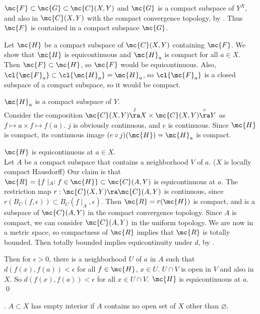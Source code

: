  \(\mc{F} \subset \mc{G} \subset \mc{C}(X, Y)\) and \(\mc{G}\) is a compact subspace of \(Y^X\), and also in \(\mc{C}(X, Y)\) with the compact convergence topology, by . Thus \(\mc{F}\) is contained in a compact subspace \(\mc{G}\).

\note{\mimpd} Let \(\mc{H}\) be a compact subspace of \(\mc{C}(X, Y)\) containing \(\mc{F}\). We show that \(\mc{H}\) is equicontinuous and \(\mc{H}_a\) is compact for all \(a \in X\). Then \(\mc{F} \subset \mc{H}\), so \(\mc{F}\) would be equicontinuous. Also, \(\cl{\mc{F}_a} \subset \cl{\mc{H}_a} = \mc{H}_a\), so \(\cl{\mc{F}_a}\) is a closed subspace of a compact subspace, so it would be compact.

 \(\mc{H}_a\) is a compact subspace of \(Y\).\\
Consider the composition \(\mc{C}(X, Y) \overset{j}{\ra} X \times \mc{C}(X, Y) \overset{e}{\ra} Y\) as \(f \mapsto a \times f \mapsto f(a)\). \(j\) is obviously continuous, and \(e\) is continuous. Since \(\mc{H}\) is compact, its continuous image \((e\circ j)(\mc{H}) = \mc{H}_a\) is compact.

 \(\mc{H}\) is equicontinuous at \(a \in X\).\\
Let \(A\) be a compact subspace that contains a neighborhood \(V\) of \(a\). (\(X\) is locally compact Hausdorff) Our claim is that \(\mc{R} = \{f \mid_A : f \in \mc{H}\} \subset \mc{C}(A, Y)\) is equicontinuous at \(a\). The restriction map \(r : \mc{C}(X, Y) \ra \mc{C}(A, Y)\) is continuous, since \(r(B_C(f, \epsilon)) \subset B_C(f\mid_A, \epsilon)\). Then \(\mc{R} = r(\mc{H})\) is compact, and is a subspace of \(\mc{C}(A, Y)\) in the compact convergence topology. Since \(A\) is compact, we can consider \(\mc{C}(A, Y)\) in the uniform topology. We are now in a metric space, so compactness of \(\mc{R}\) implies that \(\mc{R}\) is totally bounded. Then totally bounded implies equicontinuity under \(d\), by .

Then for \(\epsilon > 0\), there is a neighborhood \(U\) of \(a\) in \(A\) such that \(d(f(x), f(a)) < \epsilon\) for all \(f \in \mc{H}\), \(x \in U\). \(U \cap V\) is open in \(V\) and also in \(X\). So \(d(f(x), f(a)) < \epsilon\) for all \(x \in U \cap V\). \(\mc{H}\) is equicontinuous at \(a\). \qed


. \(A \subset X\) has empty interior if \(A\) contains no open set of \(X\) other than \(\varnothing\).

